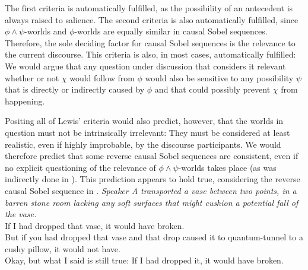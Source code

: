 The first criteria is automatically fulfilled, as the possibility of an antecedent is always raised to salience. The second criteria is also automatically fulfilled, since $\phi\land\psi$-worlds and $\phi$-worlds are equally similar in causal Sobel sequences. Therefore, the sole deciding factor for causal Sobel sequences is the relevance to the current discourse. This criteria is also, in most cases, automatically fulfilled: We would argue that any question under discussion that considers it relevant whether or not $\chi$ would follow from $\phi$ would also be sensitive to any possibility $\psi$ that is directly or indirectly caused by $\phi$ and that could possibly prevent $\chi$ from happening.

Positing all of Lewis' criteria would also predict, however, that the worlds in question must not be intrinsically irrelevant: They must be considered at least realistic, even if highly improbable, by the discourse participants. We would therefore predict that some reverse causal Sobel sequences are consistent, even if no explicit questioning of the relevance of $\phi\land\psi$-worlds takes place (as was indirectly done in ). This prediction appears to hold true, considering the reverse causal Sobel sequence in .
\ex{}\textit{Speaker A transported a vase between two points, in a barren stone room lacking any soft surfaces that might cushion a potential fall of the vase.}\\
If I had dropped that vase, it would have broken.\\
But if you had dropped that vase and that drop caused it to quantum-tunnel to a cushy pillow, it would not have.\\
Okay, but what I said is still true: If I had dropped it, it would have broken.
\xe

